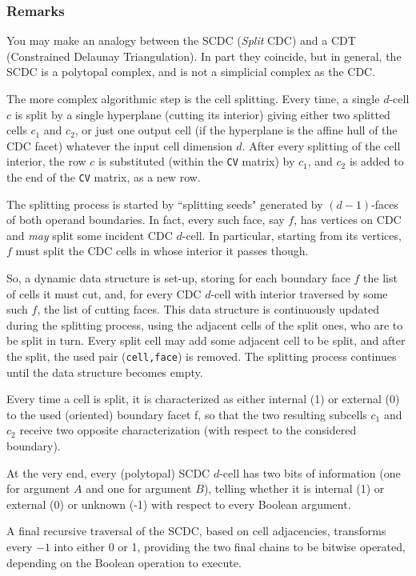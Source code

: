 \documentclass[11pt,oneside]{article}	%
\begin{document}
\subsubsection{Remarks}
You may  make an analogy between the SCDC (\emph{Split} CDC) and a CDT (Constrained Delaunay Triangulation).  In part they coincide, but in general, the SCDC is a polytopal complex, and is not a simplicial complex as the CDC.

The more complex algorithmic step is the cell splitting.  
Every time, a single $d$-cell  $c$  is split by a single hyperplane (cutting its interior)  giving either two splitted cells $c_1$ and $c_2$, or just one output cell (if the hyperplane is the affine hull of the CDC facet)
whatever the input cell dimension $d$.  After every splitting of the cell interior, the row $c$ is substituted (within the \texttt{CV} matrix) by $c_1$, and $c_2$ is 
added to the end of the \texttt{CV} matrix, as a new row.

The splitting process is started by ``splitting seeds" generated by $(d-1)$-faces of both operand boundaries.
In fact, every such face, say $f$, has vertices on CDC and \emph{may} split some incident CDC $d$-cell.  In particular, starting from its vertices,
$f$ must split the CDC cells in whose interior it passes though.

So, a dynamic data structure is set-up, storing for each boundary face $f$ the list of cells it must cut, and, for every CDC $d$-cell with interior traversed
by some such $f$, the list of cutting faces.  This data structure is continuously updated during the splitting process, using the 
adjacent cells of the split ones, who are to be split in turn.  Every split cell may add some adjacent cell to be split, and after the split,
the used pair (\texttt{cell,face}) is removed.  The splitting process continues until the data structure becomes empty.

Every time a cell is split, it is characterized as either internal (1) or external (0) to the used (oriented) boundary facet f, so that the two 
resulting subcells $c_1$ and $c_2$  receive two opposite characterization (with respect to the considered boundary).

At the very end, every (polytopal) SCDC $d$-cell has two bits of information (one for argument $A$ and one for argument $B$), telling whether it is internal  (1) or external (0) or unknown (-1) with respect to every Boolean argument.

A final recursive traversal of the SCDC, based on cell adjacencies, transforms every $-1$ into either 0 or 1, providing the two final chains to be bitwise operated, depending on the Boolean operation to execute.
\end{document}
